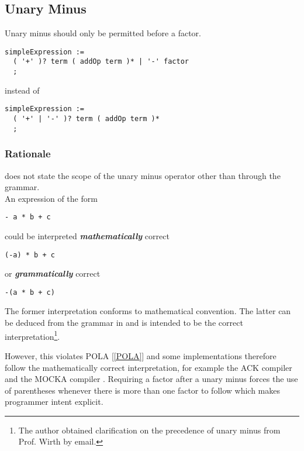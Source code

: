 \documentclass[10pt,a4paper]{article}
\renewcommand{\emph}[1]{\textbf{\textit{#1}}}
\begin{document}
\subsection{Unary Minus}

Unary minus should only be permitted before a factor.

\begin{verbatim}
simpleExpression :=
  ( '+' )? term ( addOp term )* | '-' factor
  ;
\end{verbatim}

\noindent instead of

\begin{verbatim}
simpleExpression :=
  ( '+' | '-' )? term ( addOp term )*
  ;
\end{verbatim}

\subsubsection{Rationale}

\cite{Wirth88} does not state the scope of the unary minus operator other than
through the grammar.\\

\noindent An expression of the form
\begin{lstlisting}
- a * b + c
\end{lstlisting}

\noindent could be interpreted \emph{mathematically} correct
\begin{lstlisting}
(-a) * b + c
\end{lstlisting}

\noindent or \emph{grammatically} correct
\begin{lstlisting}
-(a * b + c)
\end{lstlisting}

The former interpretation conforms to mathematical convention. The latter can
be deduced from the grammar in \cite[pp.156-157]{Wirth88} and is intended to
be the correct interpretation\footnote{The author obtained clarification on the precedence of unary minus from Prof. Wirth by email.}.

\newpage

\noindent However, this violates POLA [\ref{POLA}] and some implementations
therefore follow the mathematically correct interpretation, for example the
ACK compiler \cite{ACK} and the MOCKA compiler \cite{MOCKA}. Requiring a
factor after a unary minus forces the use of parentheses whenever there is
more than one factor to follow which makes programmer intent explicit.
\end{document}
